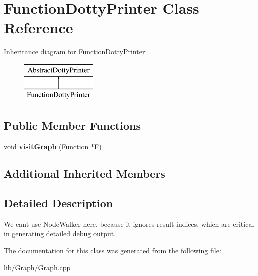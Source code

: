 \hypertarget{class_function_dotty_printer}{}\section{Function\+Dotty\+Printer Class Reference}
\label{class_function_dotty_printer}
Inheritance diagram for Function\+Dotty\+Printer\+:\begin{figure}[H]
\begin{center}
\leavevmode
\includegraphics[height=2.000000cm]{class_function_dotty_printer}
\end{center}
\end{figure}
\subsection*{Public Member Functions}
\begin{DoxyCompactItemize}
\item 
\mbox{\label{class_function_dotty_printer_a4c9cf69cd1a086b5d8afaaf4c842758c}} 
void {\bfseries visit\+Graph} (\hyperlink{classglow_1_1_function}{Function} $\ast$F)
\end{DoxyCompactItemize}
\subsection*{Additional Inherited Members}


\subsection{Detailed Description}
We can\textquotesingle{}t use Node\+Walker here, because it ignores result indices, which are critical in generating detailed debug output. 

The documentation for this class was generated from the following file\+:\begin{DoxyCompactItemize}
\item 
lib/\+Graph/Graph.\+cpp\end{DoxyCompactItemize}
